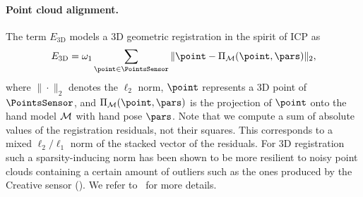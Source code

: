 %
%
%
%
%


\paragraph*{Point cloud alignment.}
The term $E_{\text{3D}}$ models a 3D geometric registration in the spirit of ICP as
%
\begin{equation}
    E_{\text{3D}}  = \omegacloud \sum_{\point \in \PointsSensor} \| \point - \proj_{\handmodel}(\point,\pars) \|_2,
\label{eq:align3d}
\end{equation}
%
where $\|\cdot\|_2$ denotes the $\ell_2$ norm, $\point$ represents a 3D point of $\PointsSensor$, and $\proj_{\handmodel}(\point,\pars)$ is the projection of $\point$ onto the hand model $\mathcal{M}$ with hand pose $\pars$. 
%
 Note that we compute a sum of absolute values of the registration residuals, not their squares. This corresponds to a mixed $\ell_{2}/\ell_{1}$ norm of the stacked vector of the residuals. For 3D registration such a sparsity-inducing norm has been shown to be more resilient to noisy point clouds containing a certain amount of outliers
such as the ones produced by the Creative sensor (). We refer to~\cite{bouaziz_sgp13} for more details.


